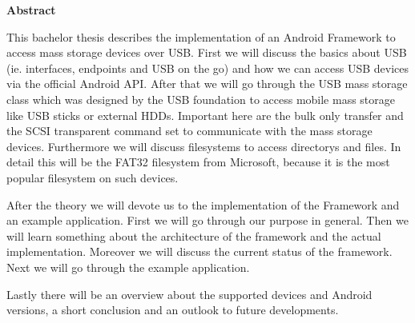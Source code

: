 

\clearemptydoublepage
{}
{}	





\vspace*{2cm}
\begin{center}
{\Large \bf Abstract}
\end{center}
\vspace{1cm}

This bachelor thesis describes the implementation of an Android Framework to access mass storage devices over USB. First we will discuss the basics about USB (ie. interfaces, endpoints and USB on the go) and how we can access USB devices via the official Android API. After that we will go through the USB mass storage class which was designed by the USB foundation to access mobile mass storage like USB sticks or external HDDs. Important here are the bulk only transfer and the SCSI transparent command set to communicate with the mass storage devices. Furthermore we will discuss filesystems to access directorys and files. In detail this will be the FAT32 filesystem from Microsoft, because it is the most popular filesystem on such devices.

After the theory we will devote us to the implementation of the Framework and an example application. First we will go through our purpose in general. Then we will learn something about the architecture of the framework and the actual implementation. Moreover we will discuss the current status of the framework. Next we will go through the example application.

Lastly there will be an overview about the supported devices and Android versions, a short conclusion and an outlook to future developments.